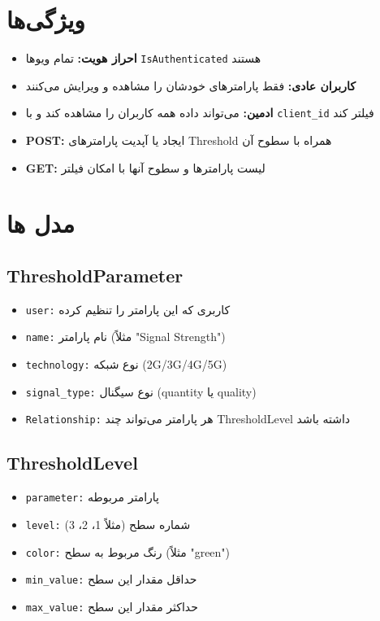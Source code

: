 \documentclass{report}
\begin{document}
\section{ویژگی‌ها}
\begin{itemize}
    \item \textbf{احراز هویت:} تمام ویوها \texttt{IsAuthenticated} هستند
    \item \textbf{کاربران عادی:} فقط پارامترهای خودشان را مشاهده و ویرایش می‌کنند
    \item \textbf{ادمین:} می‌تواند داده همه کاربران را مشاهده کند و با \texttt{client\_id} فیلتر کند
    \item \textbf{POST:} ایجاد یا آپدیت پارامترهای Threshold همراه با سطوح آن
    \item \textbf{GET:} لیست پارامترها و سطوح آنها با امکان فیلتر
\end{itemize}

\section{مدل ها}

\subsection{ThresholdParameter}
\begin{itemize}
    \item \texttt{user:} کاربری که این پارامتر را تنظیم کرده
    \item \texttt{name:} نام پارامتر (مثلاً "Signal Strength")
    \item \texttt{technology:} نوع شبکه (2G/3G/4G/5G)
    \item \texttt{signal\_type:} نوع سیگنال (quantity یا quality)
    \item \texttt{Relationship:} هر پارامتر می‌تواند چند ThresholdLevel داشته باشد
\end{itemize}

\subsection{ThresholdLevel}
\begin{itemize}
    \item \texttt{parameter:} پارامتر مربوطه
    \item \texttt{level:} شماره سطح (مثلاً 1، 2، 3)
    \item \texttt{color:} رنگ مربوط به سطح (مثلاً "green")
    \item \texttt{min\_value:} حداقل مقدار این سطح
    \item \texttt{max\_value:} حداکثر مقدار این سطح
\end{itemize}
\end{document}
